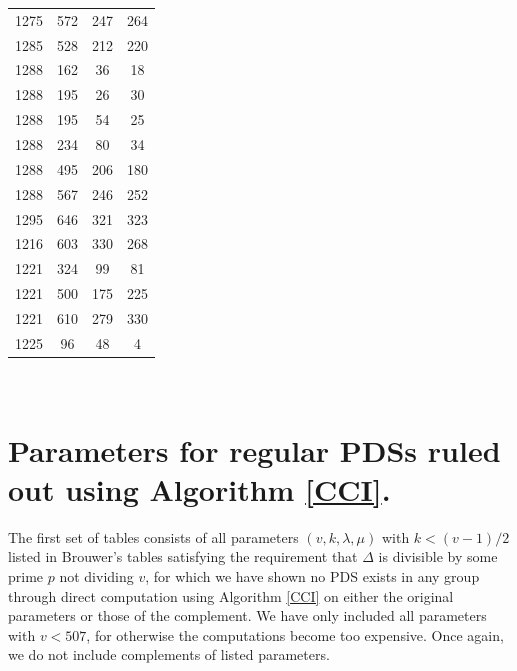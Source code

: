 \documentclass[12pt]{amsproc} %
\theoremstyle{definition}\newtheorem{defn}[thm]{Definition}
\theoremstyle{definition}\newtheorem{rem}[thm]{Remark}
\theoremstyle{definition}\newtheorem{ex}[thm]{Example}
\begin{document}
\begin{table}[ht]
\begin{minipage}{0.25\textwidth}
\begin{tabular}{c|c|c|c}
      1275&572&247&264\\ 
      1285&528&212&220\\ 
      1288&162&36&18\\ 
      1288&195&26&30\\ 
      1288&195&54&25\\ 
      1288&234&80&34\\ 
       1288&495&206&180\\ 
      1288&567&246&252\\ 
      1295&646&321&323\\  
      1216&603&330&268\\ 
      1221&324&99&81\\ 
      1221&500&175&225\\ 
      1221&610&279&330\\ 
      1225&96&48&4\\ 
            \end{tabular}
	\end{minipage}
\end{table}


\FloatBarrier

$\phantom{x}$

\newpage

\section{Parameters for regular PDSs ruled out using Algorithm \ref{CCI}.}
\label{app:B}

The first set of tables consists of all parameters $(v, k, \lambda, \mu)$ with $k < (v-1)/2$ listed in Brouwer's tables \cite{brouwertables} satisfying the requirement that $\Delta$ is divisible by some prime $p$ not dividing $v$, for which we have shown no PDS exists in any group through direct computation using Algorithm \ref{CCI} on either the original parameters or those of the complement. We have only included all parameters with $v < 507$, for otherwise the computations become too expensive. Once again, we do not include complements of listed parameters.
\end{document}
